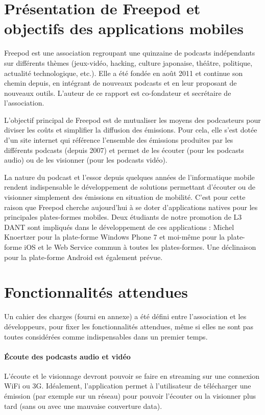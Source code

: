 \documentclass[11pt, french]{report}
\begin{document}
\section{Présentation de Freepod et objectifs des applications mobiles}

Freepod est une association regroupant une quinzaine de podcasts indépendants sur différents thèmes (jeux-vidéo, hacking, culture japonaise, théâtre, politique, actualité technologique, etc.). Elle a été fondée en août 2011 et continue son chemin depuis, en intégrant de nouveaux podcasts et en leur proposant de nouveaux outils. L’auteur de ce rapport est co-fondateur et secrétaire de l’association.

L’objectif principal de Freepod est de mutualiser les moyens des podcasteurs pour diviser les coûts et simplifier la diffusion des émissions.
Pour cela, elle s’est dotée d’un site internet qui référence l’ensemble des émissions produites par les différents podcasts (depuis 2007) et permet de les écouter (pour les podcasts audio) ou de les visionner (pour les podcasts vidéo).

La nature du podcast et l'essor depuis quelques années de l’informatique mobile rendent indispensable le développement de solutions permettant d’écouter ou de visionner simplement des émissions en situation de mobilité. C’est pour cette raison que Freepod cherche aujourd’hui à se doter d’applications natives pour les principales plates-formes mobiles. 
Deux étudiants de notre promotion de L3 DANT sont impliqués dans le développement de ces applications : Michel Knoertzer pour la plate-forme Windows Phone 7 et moi-même pour la plate-forme iOS et le Web Service commun à toutes les plates-formes. Une déclinaison pour la plate-forme Android est également prévue.

\section{Fonctionnalités attendues}

Un cahier des charges (fourni en annexe) a été défini entre l’association et les développeurs, pour fixer les fonctionnalités attendues, même si elles ne sont pas toutes considérées comme indispensables dans un premier temps.

\paragraph{Écoute des podcasts audio et vidéo}

L’écoute et le visionnage devront pouvoir se faire en streaming sur une connexion WiFi ou 3G. Idéalement, l’application permet à l’utilisateur de télécharger une émission (par exemple sur un réseau) pour pouvoir l’écouter ou la visionner plus tard (sans ou avec une mauvaise couverture data).
\end{document}
